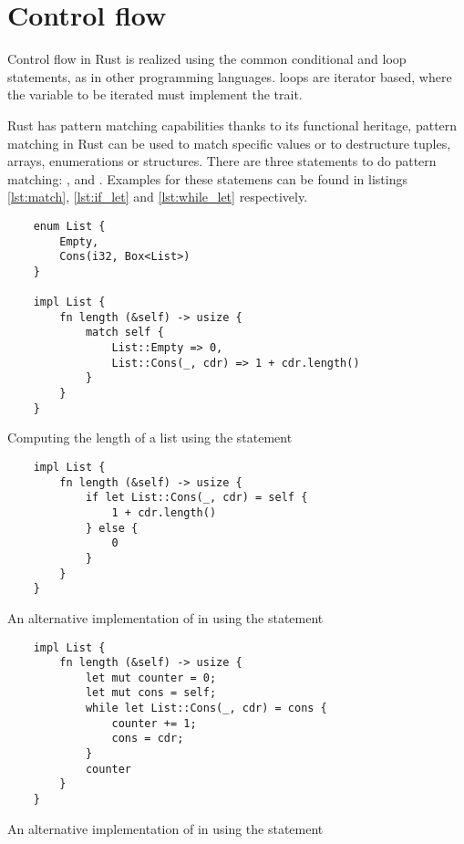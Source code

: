 \section{Control flow}

Control flow in Rust is realized using the common  conditional
and  loop statements, as in other programming languages.
 loops are iterator based, where the variable to be iterated must
implement the  trait.

Rust has pattern matching capabilities thanks to its functional heritage,
pattern matching in Rust can be used to match specific values or to destructure
tuples, arrays, enumerations or structures. There are three statements to do
pattern matching: ,  and .
Examples for these statemens can be found in listings \ref{lst:match},
\ref{lst:if_let} and \ref{lst:while_let} respectively.

\begin{listing}[h]
	\begin{verbatim}
    enum List {
        Empty,
        Cons(i32, Box<List>)
    }

    impl List {
        fn length (&self) -> usize {
            match self {
                List::Empty => 0,
                List::Cons(_, cdr) => 1 + cdr.length()
            }
        } 
    }
    \end{verbatim}
    \caption{Computing the length of a list using the  statement}
  \label{lst:match}
\end{listing}

\begin{listing}[h]
	\begin{verbatim}
    impl List {
        fn length (&self) -> usize {
            if let List::Cons(_, cdr) = self {
                1 + cdr.length()
            } else {
                0
            }
        } 
    }
    \end{verbatim}
    \caption{An alternative implementation of  in  using the  statement}
  \label{lst:if_let}
\end{listing}

\begin{listing}[h]
	\begin{verbatim}
    impl List {
        fn length (&self) -> usize {
            let mut counter = 0;
            let mut cons = self;
            while let List::Cons(_, cdr) = cons {
                counter += 1;
                cons = cdr;
            }
            counter
        } 
    }
    \end{verbatim}
    \caption{An alternative implementation of  in 
    using the  statement}
  \label{lst:while_let}
\end{listing}

